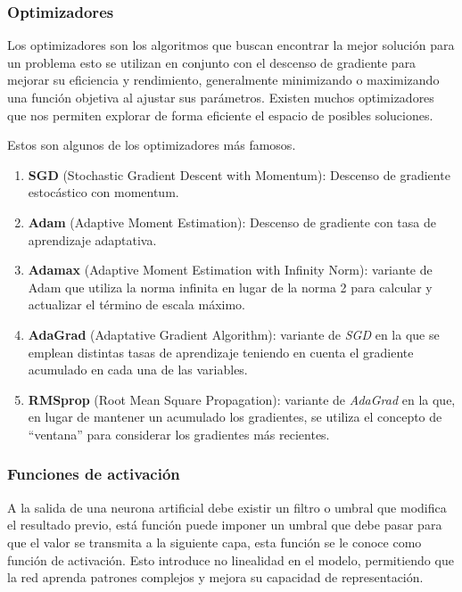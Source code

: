 

\subsubsection{Optimizadores\label{optimizers}}
Los optimizadores son los algoritmos que buscan encontrar la mejor solución para un problema esto se utilizan en conjunto con el descenso de gradiente para mejorar su eficiencia y rendimiento, generalmente minimizando o maximizando una función objetiva al ajustar sus parámetros. Existen muchos optimizadores que nos permiten explorar de forma eficiente el espacio de posibles soluciones.


Estos son algunos de los optimizadores más famosos.
\begin{enumerate}
    \item \textbf{SGD} (Stochastic Gradient Descent with Momentum): Descenso de gradiente estocástico con momentum.
    \item \textbf{Adam} (Adaptive Moment Estimation): Descenso de gradiente con tasa de aprendizaje adaptativa.
    \item \textbf{Adamax} (Adaptive Moment Estimation with Infinity Norm):  variante de Adam que utiliza la norma infinita en lugar de la norma 2 para calcular y actualizar el término de escala máximo.
    \item \textbf{AdaGrad} (Adaptative Gradient Algorithm): variante de \textit{SGD} en la que se emplean distintas tasas de aprendizaje teniendo en cuenta el gradiente acumulado en cada una de las variables.
    \item \textbf{RMSprop} (Root Mean Square Propagation): variante de \textit{AdaGrad} en la que, en lugar de mantener un acumulado los gradientes, se utiliza el concepto de ``ventana'' para considerar los gradientes más recientes.
\end{enumerate}


\subsubsection{Funciones de activación\label{sec:activations-functions}}
A la salida de una neurona artificial debe existir un filtro o umbral que modifica el resultado previo, está función puede imponer un umbral que debe pasar para que el valor se transmita a la siguiente capa, esta función se le conoce como función de activación.
Esto introduce no linealidad en el modelo, permitiendo que la red aprenda patrones complejos y mejora su capacidad de representación.

